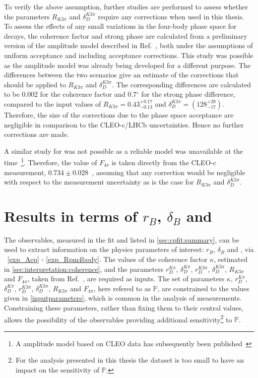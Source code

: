 To verify the above assumption, further studies are performed to assess whether the parameters $R_{K3\pi}$ and $\delta_D^{K3\pi}$ require any corrections when used in this thesis. To assess the effects of any small variations in the four-body phase space for \kpipipi decays, the coherence factor and strong phase are calculated from a preliminary version of the \decay{\Dz}{\Km\pip\pim\pip} amplitude model described in Ref.~\cite{LHCb-PAPER-2017-040}, both under the assumptions of uniform acceptance and including \lhcb acceptance corrections. This study was possible as the \decay{\Dz}{\Km\pip\pim\pip} amplitude model was already being developed for a different purpose. The differences between the two scenarios give an estimate of the corrections that should be applied to $R_{K3\pi}$ and $\delta_D^{K3\pi}$. The corresponding differences are calculated to be 0.002 for the coherence factor and 0.7$^{\circ}$ for the strong phase difference, compared to the input values of $R_{K3\pi} = 0.43^{+0.17}_{-0.13}$ and $\delta_D^{K3\pi} = \left(128^{+28}_{-17}\right)$. Therefore, the size of the corrections due to the \lhcb phase space acceptance are negligible in comparison to the CLEO-c/LHCb uncertainties. Hence no further corrections are made. 

A similar study for \decay{\Dz}{\pim\pip\pim\pip} was not possible as a reliable model was unavailable at the time~\footnote{A \decay{\Dz}{\pim\pip\pim\pip} amplitude model based on CLEO data has subsequently been published~\cite{4piamplitude}}. Therefore, the value of $F_{4\pi}$ is taken directly from the CLEO-c measurement, $0.734 \pm 0.028$~\cite{charm4pi}, assuming that any correction would be negligible with respect to the measurement uncertainty as is the case for $R_{K3\pi}$ and $\delta_D^{K3\pi}$. 

\section{Results in terms of $r_B$, $\delta_B$ and \Pgamma}
\label{sec:interpretation:gammadini}

The \CP observables, measured in the \CP fit and listed in \sect\ref{sec:cpfit:summary}, can be used to extract information on the physics parameters of interest: $r_B$, $\delta_B$ and \Pgamma, via \eqns~\ref{exp_Acp} - \ref{exp_Rpm4body}. The values of the coherence factor $\kappa$, estimated in \sect\ref{sec:interpretation:coherence}, and the parameters $r_D^{K\pi}$, $\delta_D^{K\pi}$, $r_D^{K3\pi}$, $\delta_D^{K3\pi}$, $R_{K3\pi}$ and $F_{4\pi}$, taken from Ref.~\cite{HFAG,charmk3pi,charmk3pi_errata,LHCb-PAPER-2015-057,charm4pi}, are required as inputs. The set of parameters $\kappa$, $r_D^{K\pi}$, $\delta_D^{K\pi}$, $r_D^{K3\pi}$, $\delta_D^{K3\pi}$, $R_{K3\pi}$ and $F_{4\pi}$, here refered to as $\mathbb{P}$, are constrained to the values given in \tab\ref{inputparameters}, which is common in the analysis of \lhcb measurements. Constraining these parameters, rather than fixing them to their central values, allows the possibility of the \CP observables providing additional sensitivity\footnote{For the analysis presented in this thesis the dataset is too small to have an impact on the sensitivity of $\mathbb{P}$.} to $\mathbb{P}$.

